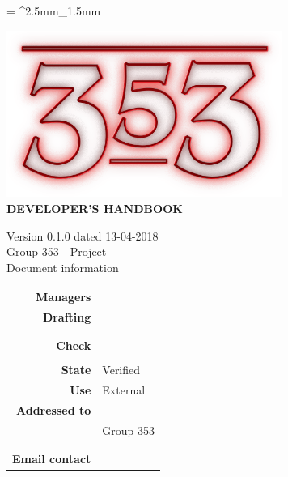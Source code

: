 \documentclass[openany, a4paper, 12pt]{report}
\begin{document}
	
	\tabulinesep = ^2.5mm_1.5mm
	
	\begin{titlepage}
		\centering
		\vfill
		{
			\bfseries
			\vskip2cm
			\includegraphics[width=9cm]{../../common/images/logo.png} \\
			\vfill
			\Huge{DEVELOPER'S HANDBOOK}\\
			\vfill

			\Large Version 0.1.0 dated 13-04-2018\\ 
			\large Group 353 - Project \progetto \\
			\vfill
			\normalsize Document information\\
			\begin{table}[htbp]
				\centering
				\renewcommand\arraystretch{1.2}
				\begin{tabular}{r|l}
					\hline

					\textbf{Managers}	& \Valentina \\
					
					\textbf{Drafting} 		& \Elena \\
											& \Parwinder\\
											& \Mirco \\
											
					\textbf{Check} 			& \Riccardo \\	
											& \Gianluca \\
											
					\textbf{State} 			& Verified\\
					\textbf{Use}			& External\\
					\textbf{Addressed to}   	& \Proponente\\
										& Group 353\\
										& \Vardanega\\
										& \Cardin\\
					
					\textbf{Email contact}	& \mailgroup
				\end{tabular}
			\end{table}
			\vfill
		}    
	\end{titlepage}
	
	\renewcommand{\contentsname}{Index}
	\tableofcontents
	\renewcommand{\listfigurename}{List of Figures}
	\listoffigures
	\newpage
	
	
	
	
	
	
	
	
	
	
\end{document}
